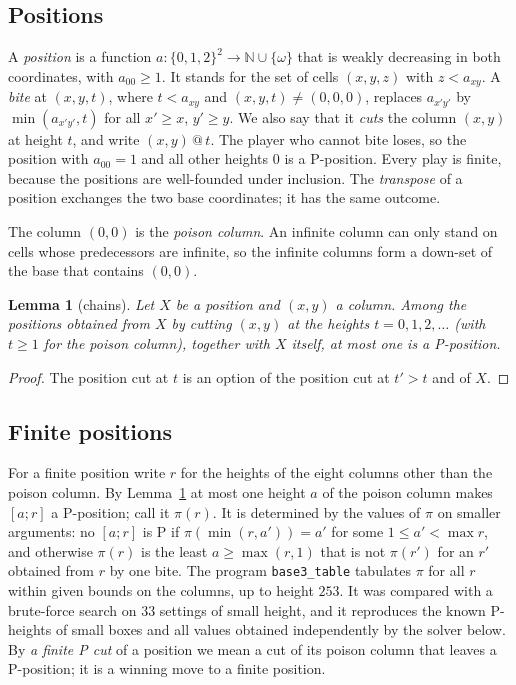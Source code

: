 \documentclass[11pt]{amsart}
\makeatletter
\newtheorem{lemma}[theorem]{Lemma}
\theoremstyle{definition}
\theoremstyle{remark}
\newcommand{\w}{\omega}
\newcommand{\cut}[2]{#1\,@\,#2}
\makeatother
\begin{document}
\subsection{Positions}
A \emph{position} is a function $a\colon\{0,1,2\}^2\to\mathbb N\cup\{\w\}$ that is weakly
decreasing in both coordinates, with $a_{00}\ge1$. It stands for the set of cells $(x,y,z)$ with
$z<a_{xy}$. A \emph{bite} at $(x,y,t)$, where $t<a_{xy}$ and $(x,y,t)\ne(0,0,0)$, replaces
$a_{x'y'}$ by $\min(a_{x'y'},t)$ for all $x'\ge x$, $y'\ge y$. We also say that it \emph{cuts}
the column $(x,y)$ at height $t$, and write $\cut{(x,y)}{t}$. The player who cannot bite
loses, so the position with $a_{00}=1$ and all other heights $0$ is a P-position. Every play is
finite, because the positions are well-founded under inclusion. The \emph{transpose} of a
position exchanges the two base coordinates; it has the same outcome.

The column $(0,0)$ is the \emph{poison column}. An infinite column can only stand on cells
whose predecessors are infinite, so the infinite columns form a down-set of the base that
contains $(0,0)$.

\begin{lemma}[chains]\label{lem:chain}
Let $X$ be a position and $(x,y)$ a column. Among the positions obtained from $X$ by cutting
$(x,y)$ at the heights $t=0,1,2,\dots$ (with $t\ge1$ for the poison column), together with $X$
itself, at most one is a P-position.
\end{lemma}
\begin{proof}
The position cut at $t$ is an option of the position cut at $t'>t$ and of $X$.
\end{proof}

\subsection{Finite positions}
For a finite position write $r$ for the heights of the eight columns other than the poison
column. By Lemma~\ref{lem:chain} at most one height $a$ of the poison column makes $[a;r]$ a
P-position; call it $\pi(r)$. It is determined by the values of $\pi$ on smaller arguments:
no $[a;r]$ is P if $\pi(\min(r,a'))=a'$ for some $1\le a'<\max r$, and otherwise $\pi(r)$ is
the least $a\ge\max(r,1)$ that is not $\pi(r')$ for an $r'$ obtained from $r$ by one bite.
The program \texttt{base3\_table} tabulates $\pi$ for all $r$ within given bounds on the
columns, up to height $253$. It was compared with a brute-force search on $33$ settings of
small height, and it reproduces the known P-heights of small boxes and all values obtained
independently by the solver below. By \emph{a finite P cut} of a position we mean a cut of
its poison column that leaves a P-position; it is a winning move to a finite position.
\end{document}
